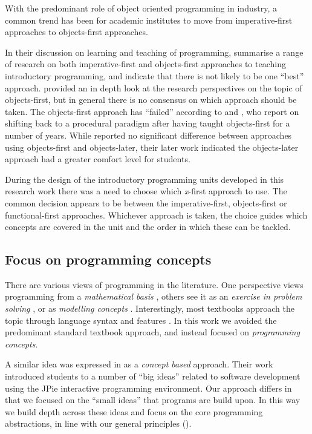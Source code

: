 With the predominant role of object oriented programming in industry, a common trend has been for academic institutes to move from imperative-first approaches to objects-first approaches. 

In their discussion on learning and teaching of programming, \citet{Robins:2003} summarise a range of research on both imperative-first and objects-first approaches to teaching introductory programming, and indicate that there is not likely to be one ``best'' approach. \citet{Lister:2006a} provided an in depth look at the research perspectives on the topic of objects-first, but in general there is no consensus on which approach should be taken. The objects-first approach has ``failed'' according to \citet{Astrachan:2005} and \citet{Reges:2006}, who report on shifting back to a procedural paradigm after having taught objects-first for a number of years. While \citet{Ehlert:2009} reported no significant difference between approaches using objects-first and objects-later, their later work \cite{Ehlert:2010} indicated the objects-later approach had a greater comfort level for students. 

During the design of the introductory programming units developed in this research work there was a need to choose which \emph{x}-first approach to use. The common decision appears to be between the imperative-first, objects-first or functional-first approaches. Whichever approach is taken, the choice guides which concepts are covered in the unit and the order in which these can be tackled.


\subsection{Focus on programming concepts} %
\label{sub:focus_on_programming_concepts}

There are various views of programming in the literature. One perspective views programming from a \emph{mathematical basis} \cite{Denning:1989,Dijkstra:1989,Hoare:1969}, others see it as an \emph{exercise in problem solving} \cite{Palumbo:1990}, or as \emph{modelling concepts} \cite{Bennedsen:2004}. Interestingly, most textbooks approach the topic through language syntax and features \cite{Robins:2003}. In this work we avoided the predominant standard textbook approach, and instead focused on \emph{programming concepts}.

A similar idea was expressed in \citet{Goldman:2004} as a \emph{concept based} approach. Their work introduced students to a number of ``big ideas'' related to software development using the JPie interactive programming environment. Our approach differs in that we focused on the ``small ideas'' that programs are build upon. In this way we build depth across these ideas and focus on the core programming abstractions, in line with our general principles ().

